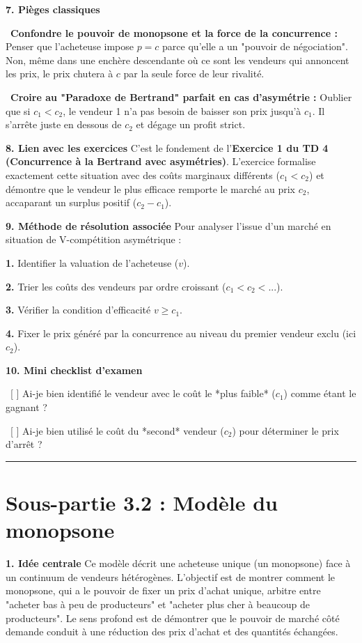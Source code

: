 \documentclass[11pt, a4paper]{report}
\begin{document}
\textbf{7. Pièges classiques}
\par \textbullet\ \textbf{Confondre le pouvoir de monopsone et la force de la concurrence :} Penser que l'acheteuse impose $p=c$ parce qu'elle a un "pouvoir de négociation". Non, même dans une enchère descendante où ce sont les vendeurs qui annoncent les prix, le prix chutera à $c$ par la seule force de leur rivalité.
\par \textbullet\ \textbf{Croire au "Paradoxe de Bertrand" parfait en cas d'asymétrie :} Oublier que si $c_1 < c_2$, le vendeur 1 n'a pas besoin de baisser son prix jusqu'à $c_1$. Il s'arrête juste en dessous de $c_2$ et dégage un profit strict.

\textbf{8. Lien avec les exercices}
C'est le fondement de l'\textbf{Exercice 1 du TD 4 (Concurrence à la Bertrand avec asymétries)}. L'exercice formalise exactement cette situation avec des coûts marginaux différents ($c_1 < c_2$) et démontre que le vendeur le plus efficace remporte le marché au prix $c_2$, accaparant un surplus positif ($c_2 - c_1$).

\textbf{9. Méthode de résolution associée}
Pour analyser l'issue d'un marché en situation de V-compétition asymétrique :
\par \textbf{1.} Identifier la valuation de l'acheteuse ($v$).
\par \textbf{2.} Trier les coûts des vendeurs par ordre croissant ($c_1 < c_2 < ...$).
\par \textbf{3.} Vérifier la condition d'efficacité $v \ge c_1$.
\par \textbf{4.} Fixer le prix généré par la concurrence au niveau du premier vendeur exclu (ici $c_2$).

\textbf{10. Mini checklist d'examen}
\par \textbullet\ [ ] Ai-je bien identifié le vendeur avec le coût le *plus faible* ($c_1$) comme étant le gagnant ?
\par \textbullet\ [ ] Ai-je bien utilisé le coût du *second* vendeur ($c_2$) pour déterminer le prix d'arrêt ?

\vspace{1cm}\hrule\vspace{1cm}

\section{Sous-partie 3.2 : Modèle du monopsone}

\textbf{1. Idée centrale}
Ce modèle décrit une acheteuse unique (un monopsone) face à un continuum de vendeurs hétérogènes. L'objectif est de montrer comment le monopsone, qui a le pouvoir de fixer un prix d'achat unique, arbitre entre "acheter bas à peu de producteurs" et "acheter plus cher à beaucoup de producteurs". Le sens profond est de démontrer que le pouvoir de marché côté demande conduit à une réduction des prix d'achat et des quantités échangées.
\end{document}

